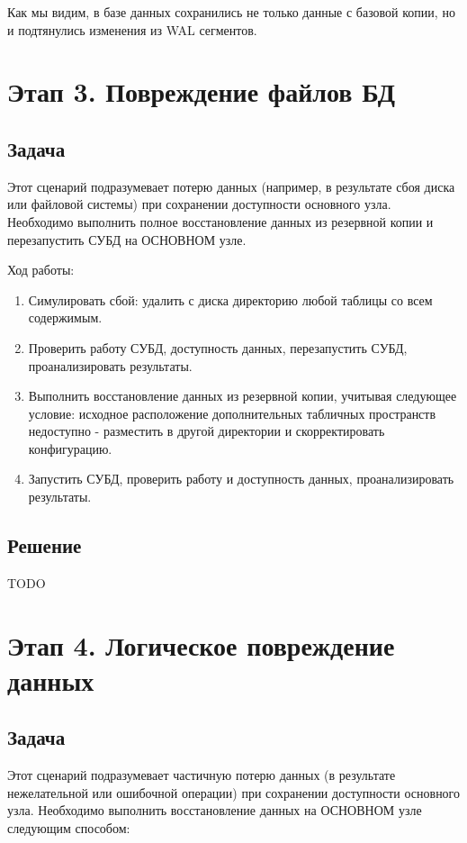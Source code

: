 \documentclass{article}
\begin{document}
Как мы видим, в базе данных сохранились не только данные с базовой копии, но и подтянулись изменения из WAL сегментов.

\section{Этап 3. Повреждение файлов БД}

\subsection{Задача}

Этот сценарий подразумевает потерю данных (например, в результате сбоя диска или файловой системы) при сохранении доступности основного узла. Необходимо выполнить полное восстановление данных из резервной копии и перезапустить СУБД на ОСНОВНОМ узле.

Ход работы:

\begin{enumerate}
    \item Симулировать сбой: удалить с диска директорию любой таблицы со всем содержимым.
    \item Проверить работу СУБД, доступность данных, перезапустить СУБД, проанализировать результаты.
    \item Выполнить восстановление данных из резервной копии, учитывая следующее условие: исходное расположение дополнительных табличных пространств недоступно - разместить в другой директории и скорректировать конфигурацию.
    \item Запустить СУБД, проверить работу и доступность данных, проанализировать результаты.
\end{enumerate}

\subsection{Решение}

TODO

\section{Этап 4. Логическое повреждение данных}

\subsection{Задача}

Этот сценарий подразумевает частичную потерю данных (в результате нежелательной или ошибочной операции) при сохранении доступности основного узла. Необходимо выполнить восстановление данных на ОСНОВНОМ узле следующим способом:
\end{document}
